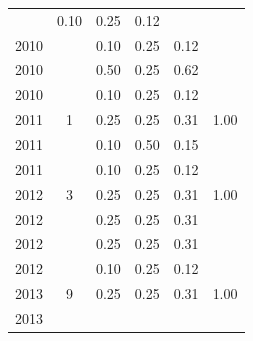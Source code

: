 \begin{table}[H]
\begin{tabular}{| l | c | c | c | c | c |}
          &
          0.10
          &
          0.25
          &
          0.12
          &
          \\
            2010
          &
          
          &
          0.10
          &
          0.25
          &
          0.12
          &
          \\
            2010
          &
          
          &
          0.50
          &
          0.25
          &
          0.62
          &
          \\
            2010
          &
          
          &
          0.10
          &
          0.25
          &
          0.12
          &
          \\
\hline
            2011
          &
          1
          &
          0.25
          &
          0.25
          &
          0.31
          &
            {\color{blue} 1.00}
          \\
            2011
          &
          
          &
          0.10
          &
          0.50
          &
          0.15
          &
          \\
            2011
          &
          
          &
          0.10
          &
          0.25
          &
          0.12
          &
          \\
\hline
            2012
          &
          3
          &
          0.25
          &
          0.25
          &
          0.31
          &
            {\color{blue} 1.00}
          \\
            2012
          &
          
          &
          0.25
          &
          0.25
          &
          0.31
          &
          \\
            2012
          &
          
          &
          0.25
          &
          0.25
          &
          0.31
          &
          \\
            2012
          &
          
          &
          0.10
          &
          0.25
          &
          0.12
          &
          \\
\hline
            2013
          &
          9
          &
          0.25
          &
          0.25
          &
          0.31
          &
            {\color{blue} 1.00}
          \\
            2013
          &
          

\end{tabular}
\end{table}
